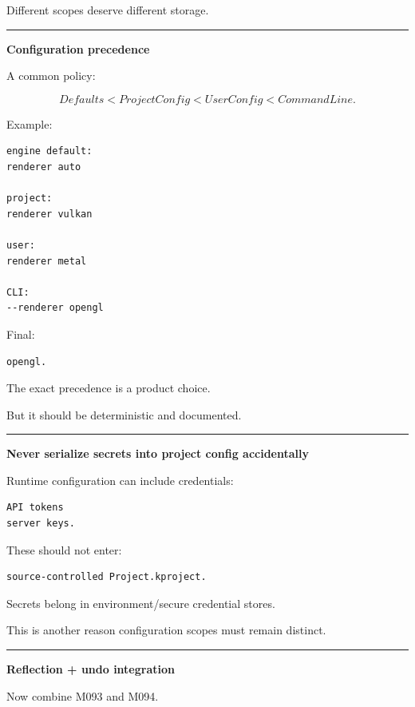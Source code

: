 Different scopes deserve different storage.

\begin{center}\rule{0.5\linewidth}{0.5pt}\end{center}

\textbf{Configuration precedence}

A common policy:

\[
Defaults
<
ProjectConfig
<
UserConfig
<
CommandLine.
\]

Example:

\begin{verbatim}
engine default:
renderer auto

project:
renderer vulkan

user:
renderer metal

CLI:
--renderer opengl
\end{verbatim}

Final:

\begin{verbatim}
opengl.
\end{verbatim}

The exact precedence is a product choice.

But it should be deterministic and documented.

\begin{center}\rule{0.5\linewidth}{0.5pt}\end{center}

\textbf{Never serialize secrets into project config accidentally}

Runtime configuration can include credentials:

\begin{verbatim}
API tokens
server keys.
\end{verbatim}

These should not enter:

\begin{verbatim}
source-controlled Project.kproject.
\end{verbatim}

Secrets belong in environment/secure credential stores.

This is another reason configuration scopes must remain distinct.

\begin{center}\rule{0.5\linewidth}{0.5pt}\end{center}

\textbf{Reflection + undo integration}

Now combine M093 and M094.

